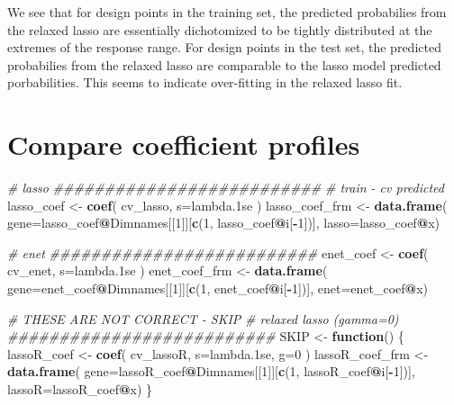 \documentclass[
]{book}
\newenvironment{Shaded}{\begin{snugshade}}{\end{snugshade}}
\newcommand{\CommentTok}[1]{\textcolor[rgb]{0.56,0.35,0.01}{\textit{#1}}}
\newcommand{\ControlFlowTok}[1]{\textcolor[rgb]{0.13,0.29,0.53}{\textbf{#1}}}
\newcommand{\DataTypeTok}[1]{\textcolor[rgb]{0.13,0.29,0.53}{#1}}
\newcommand{\DecValTok}[1]{\textcolor[rgb]{0.00,0.00,0.81}{#1}}
\newcommand{\KeywordTok}[1]{\textcolor[rgb]{0.13,0.29,0.53}{\textbf{#1}}}
\newcommand{\NormalTok}[1]{#1}
\newcommand{\OperatorTok}[1]{\textcolor[rgb]{0.81,0.36,0.00}{\textbf{#1}}}
\newcommand{\StringTok}[1]{\textcolor[rgb]{0.31,0.60,0.02}{#1}}
\begin{document}
We see that for design points in the training set, the predicted probabilies from the relaxed lasso
are essentially dichotomized to be tightly distributed at the extremes of the
response range. For design points in the test set, the predicted probabilies from the relaxed lasso
are comparable to the lasso model predicted porbabilities. This seems to indicate over-fitting
in the relaxed lasso fit.

\hypertarget{compare-coefficient-profiles}{%
\section{Compare coefficient profiles}\label{compare-coefficient-profiles}}

\begin{Shaded}
\begin{Highlighting}[]
\CommentTok{\# lasso }
\CommentTok{\#\#\#\#\#\#\#\#\#\#\#\#\#\#\#\#\#\#\#\#\#\#\#\#\#\#}
\CommentTok{\# train {-} cv predicted}
\NormalTok{lasso\_coef <{-}}\StringTok{ }\KeywordTok{coef}\NormalTok{(}
\NormalTok{ cv\_lasso,}
 \DataTypeTok{s=}\StringTok{\textquotesingle{}lambda.1se\textquotesingle{}}
\NormalTok{)}
\NormalTok{lasso\_coef\_frm <{-}}\StringTok{ }\KeywordTok{data.frame}\NormalTok{(}
 \DataTypeTok{gene=}\NormalTok{lasso\_coef}\OperatorTok{@}\NormalTok{Dimnames[[}\DecValTok{1}\NormalTok{]][}\KeywordTok{c}\NormalTok{(}\DecValTok{1}\NormalTok{, lasso\_coef}\OperatorTok{@}\NormalTok{i[}\OperatorTok{{-}}\DecValTok{1}\NormalTok{])],}
 \DataTypeTok{lasso=}\NormalTok{lasso\_coef}\OperatorTok{@}\NormalTok{x)}


\CommentTok{\# enet}
\CommentTok{\#\#\#\#\#\#\#\#\#\#\#\#\#\#\#\#\#\#\#\#\#\#\#\#\#\#}
\NormalTok{enet\_coef <{-}}\StringTok{ }\KeywordTok{coef}\NormalTok{(}
\NormalTok{ cv\_enet,}
 \DataTypeTok{s=}\StringTok{\textquotesingle{}lambda.1se\textquotesingle{}}
\NormalTok{)}
\NormalTok{enet\_coef\_frm <{-}}\StringTok{ }\KeywordTok{data.frame}\NormalTok{(}
 \DataTypeTok{gene=}\NormalTok{enet\_coef}\OperatorTok{@}\NormalTok{Dimnames[[}\DecValTok{1}\NormalTok{]][}\KeywordTok{c}\NormalTok{(}\DecValTok{1}\NormalTok{, enet\_coef}\OperatorTok{@}\NormalTok{i[}\OperatorTok{{-}}\DecValTok{1}\NormalTok{])],}
 \DataTypeTok{enet=}\NormalTok{enet\_coef}\OperatorTok{@}\NormalTok{x)}

\CommentTok{\# THESE ARE NOT CORRECT {-} SKIP}
\CommentTok{\# relaxed lasso (gamma=0)}
\CommentTok{\#\#\#\#\#\#\#\#\#\#\#\#\#\#\#\#\#\#\#\#\#\#\#\#\#\#}
\NormalTok{SKIP <{-}}\StringTok{ }\ControlFlowTok{function}\NormalTok{() \{}
\NormalTok{lassoR\_coef <{-}}\StringTok{ }\KeywordTok{coef}\NormalTok{(}
\NormalTok{ cv\_lassoR,}
 \DataTypeTok{s=}\StringTok{\textquotesingle{}lambda.1se\textquotesingle{}}\NormalTok{,}
 \DataTypeTok{g=}\DecValTok{0}
\NormalTok{)}
\NormalTok{lassoR\_coef\_frm <{-}}\StringTok{ }\KeywordTok{data.frame}\NormalTok{(}
 \DataTypeTok{gene=}\NormalTok{lassoR\_coef}\OperatorTok{@}\NormalTok{Dimnames[[}\DecValTok{1}\NormalTok{]][}\KeywordTok{c}\NormalTok{(}\DecValTok{1}\NormalTok{, lassoR\_coef}\OperatorTok{@}\NormalTok{i[}\OperatorTok{{-}}\DecValTok{1}\NormalTok{])],}
 \DataTypeTok{lassoR=}\NormalTok{lassoR\_coef}\OperatorTok{@}\NormalTok{x)}
\NormalTok{\}}


\end{Highlighting}
\end{Shaded}
\end{document}
